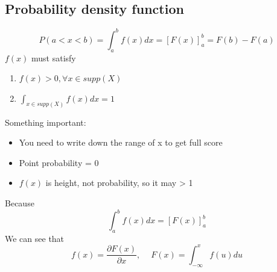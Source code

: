 \documentclass[12pt]{article}
\begin{document}
        \subsection*{Probability density function}
        \begin{equation}
            P(a<x<b)=\int_{a}^b f(x)dx = [F(x)]_a^b =F(b)-F(a)
        \end{equation}
        $f(x)$ must satisfy
        \begin{enumerate}
            \item $f(x) > 0, \forall x \in supp(X)$
            \item $\int_{x \in supp(X)}f(x)dx = 1$
        \end{enumerate}
        Something important:
        \begin{itemize}
            \item You need to write down the range of x to get full score
            \item Point probability = 0
            \item $f(x)$ is height, not probability, so it may > 1
        \end{itemize}
        Because
        \begin{equation}
            \int_{a}^b f(x)dx  = [F(x)]_a^b
        \end{equation}
        We can see that
        \begin{equation}
            f(x)=\frac{\partial F(x)}{\partial x},\quad\ F(x)=\int_{-\infty}^xf(u)du
        \end{equation}
\end{document}
